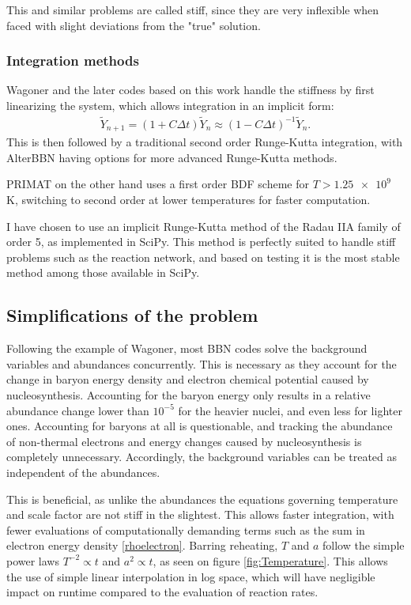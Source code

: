 This and similar problems are called stiff, since they are very inflexible when faced with slight deviations from the "true" solution. 


\subsubsection{Integration methods}

Wagoner and the later codes based on this work handle the stiffness by first linearizing the system, which allows integration in an implicit form:
\begin{align}
    \tilde{Y}_{n+1}=(1+C \Delta t)\tilde{Y}_{n}\approx(1-C \Delta t)^{-1}\tilde{Y}_{n}.
\end{align}
This is then followed by a traditional second order Runge-Kutta integration, with AlterBBN having options for more advanced Runge-Kutta methods. 

PRIMAT on the other hand uses a first order BDF scheme for $T>\num{1.25e9}$ K, switching to second order at lower temperatures for faster computation.

I have chosen to use an implicit Runge-Kutta method of the Radau IIA family of order 5, as implemented in SciPy. This method is perfectly suited to handle stiff problems such as the reaction network, and based on testing it is the most stable method among those available in SciPy.

\subsection{Simplifications of the problem}
Following the example of Wagoner, most BBN codes solve the background variables and abundances concurrently. This is necessary as they account for the change in baryon energy density and electron chemical potential caused by nucleosynthesis. Accounting for the baryon energy only results in a relative abundance change lower than $10^{-5}$ for the heavier nuclei, and even less for lighter ones. Accounting for baryons at all is questionable, and tracking the abundance of non-thermal electrons and energy changes caused by nucleosynthesis is completely unnecessary. Accordingly, the background variables can be treated as independent of the abundances.

This is beneficial, as unlike the abundances the equations governing temperature and scale factor are not stiff in the slightest. This allows faster integration, with fewer evaluations of computationally demanding terms such as the sum in electron energy density \eqref{rhoelectron}. Barring reheating, $T$ and $a$ follow the simple power laws $T^{-2}\propto t$ and $a^2\propto t$, as seen on figure \ref{fig:Temperature}. This allows the use of simple linear interpolation in log space, which will have negligible impact on runtime compared to the evaluation of reaction rates.

